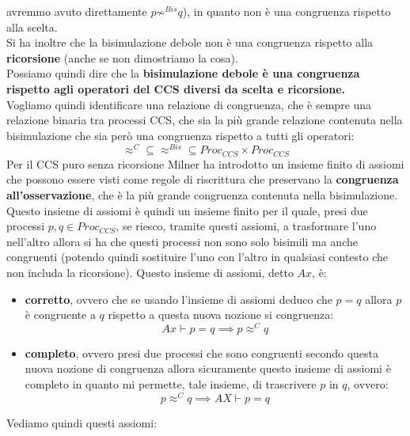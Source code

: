 \documentclass[a4paper,12pt, oneside]{book}
\begin{document}
avremmo avuto direttamente $p\not\sim^{Bis}q$), in quanto non è una congruenza
rispetto alla scelta.\\
Si ha inoltre che la bisimulazione debole non è una congruenza rispetto alla
\textbf{ricorsione} (anche se non dimostriamo la cosa).\\
Possiamo quindi dire che la \textbf{bisimulazione debole è una congruenza
  rispetto agli operatori del CCS diversi da scelta e ricorsione.}\\
Vogliamo quindi identificare una relazione di congruenza, che è sempre una
relazione binaria tra processi CCS, che sia la più grande relazione contenuta
nella bisimulazione che sia però una congruenza rispetto a tutti gli
operatori:
\[\approx^C\subseteq\approx^{Bis}\subseteq Proc_{CCS}\times Proc_{CCS}\]
Per il CCS puro senza ricorsione Milner ha introdotto un insieme
finito di assiomi che possono essere visti come regole di riscrittura che
preservano la \textbf{congruenza all'osservazione}, che è la più grande
congruenza contenuta nella bisimulazione. Questo insieme di assiomi è quindi un
insieme finito per il quale, presi due processi $p,q\in Proc_{CCS}$, se riesco,
tramite questi assiomi, a trasformare l'uno nell'altro allora si ha che questi
processi non sono solo bisimili ma anche congruenti (potendo quindi sostituire
l'uno con l'altro in qualsiasi contesto che non includa la ricorsione). Questo
insieme di assiomi, detto $Ax$, è:
\begin{itemize}
  \item \textbf{corretto}, ovvero che se usando l'insieme di assiomi deduco che
  $p=q$ allora $p$ è congruente a $q$ rispetto a questa nuova nozione si
  congruenza:
  \[Ax\vdash p=q\implies p\approx^C q\]
  \item \textbf{completo}, ovvero presi due processi che sono congruenti secondo
  questa nuova nozione di congruenza allora sicuramente questo insieme di
  assiomi è completo in quanto mi permette, tale insieme, di trascrivere $p$ in
  $q$, ovvero:
  \[p\approx^C q\implies AX\vdash p=q\]
\end{itemize}
Vediamo quindi questi assiomi:
\end{document}
